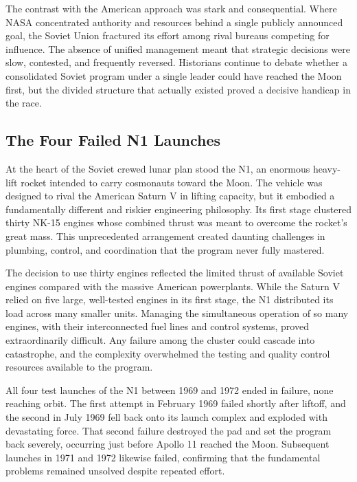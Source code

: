 The contrast with the American approach was stark and consequential. Where NASA concentrated authority and resources behind a single publicly announced goal, the Soviet Union fractured its effort among rival bureaus competing for influence. The absence of unified management meant that strategic decisions were slow, contested, and frequently reversed. Historians continue to debate whether a consolidated Soviet program under a single leader could have reached the Moon first, but the divided structure that actually existed proved a decisive handicap in the race. \cite{harford1997} \cite{siddiqi2010}

\subsection{The Four Failed N1 Launches}
At the heart of the Soviet crewed lunar plan stood the N1, an enormous heavy-lift rocket intended to carry cosmonauts toward the Moon. The vehicle was designed to rival the American Saturn V in lifting capacity, but it embodied a fundamentally different and riskier engineering philosophy. Its first stage clustered thirty NK-15 engines whose combined thrust was meant to overcome the rocket's great mass. This unprecedented arrangement created daunting challenges in plumbing, control, and coordination that the program never fully mastered.

The decision to use thirty engines reflected the limited thrust of available Soviet engines compared with the massive American powerplants. While the Saturn V relied on five large, well-tested engines in its first stage, the N1 distributed its load across many smaller units. Managing the simultaneous operation of so many engines, with their interconnected fuel lines and control systems, proved extraordinarily difficult. Any failure among the cluster could cascade into catastrophe, and the complexity overwhelmed the testing and quality control resources available to the program.

All four test launches of the N1 between 1969 and 1972 ended in failure, none reaching orbit. The first attempt in February 1969 failed shortly after liftoff, and the second in July 1969 fell back onto its launch complex and exploded with devastating force. That second failure destroyed the pad and set the program back severely, occurring just before Apollo 11 reached the Moon. Subsequent launches in 1971 and 1972 likewise failed, confirming that the fundamental problems remained unsolved despite repeated effort.

